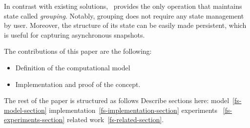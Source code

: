 In contrast with existing solutions, \FlameStream ~provides the only operation that maintains state called {\it grouping}. Notably, grouping does not require any state management by user. Moreover, the structure of its state can be easily made persistent, which is useful for capturing asynchronous snapshots.

The contributions of this paper are the following:

\begin {itemize}
\item Definition of the computational model
\item Implementation and proof of the concept.
\end {itemize}

The rest of the paper is structured as follows 
Describe sections here: model~\ref {fs-model-section}
implementation~\ref{fs-implementation-section}
experiments ~\ref{fs-experiments-section}
related work~\ref{fs-related-section}.


\endinput
